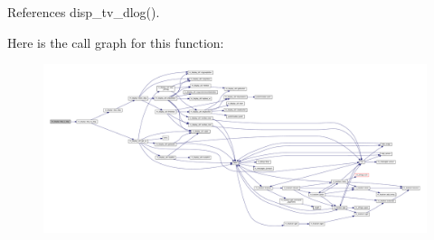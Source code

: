 References disp\+\_\+tv\+\_\+dlog().

Here is the call graph for this function\+:
\nopagebreak
\begin{figure}[H]
\begin{center}
\leavevmode
\includegraphics[width=350pt]{namespacem__display_ae5c96bc7b0b54e6e183431c31fa7ae80_cgraph}
\end{center}
\end{figure}
\mbox{\label{namespacem__display_a4ef66ee3da74984dd06012837795c459}} 
